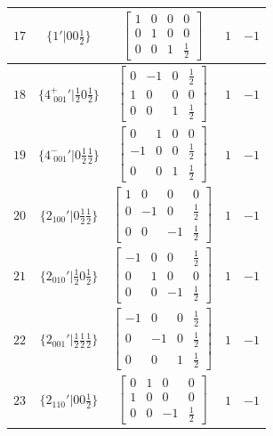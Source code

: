 \documentclass[fleqn,8pt]{jsarticle}
\begin{document}
\begin{longtable}{ccccc}
$ 17 $ & $ \{1{}'|0 0 \frac{1}{2}\} $ & $ \begin{bmatrix} 1 & 0 & 0 & 0 \\ 0 & 1 & 0 & 0 \\ 0 & 0 & 1 & \frac{1}{2} \end{bmatrix} $ & $ 1 $ & $ -1 $ \\ \hline
$ 18 $ & $ \{4^{+}_{\,\,001}{}'|\frac{1}{2} 0 \frac{1}{2}\} $ & $ \begin{bmatrix} 0 & -1 & 0 & \frac{1}{2} \\ 1 & 0 & 0 & 0 \\ 0 & 0 & 1 & \frac{1}{2} \end{bmatrix} $ & $ 1 $ & $ -1 $ \\ \hline
$ 19 $ & $ \{4^{-}_{\,\,001}{}'|0 \frac{1}{2} \frac{1}{2}\} $ & $ \begin{bmatrix} 0 & 1 & 0 & 0 \\ -1 & 0 & 0 & \frac{1}{2} \\ 0 & 0 & 1 & \frac{1}{2} \end{bmatrix} $ & $ 1 $ & $ -1 $ \\ \hline
$ 20 $ & $ \{2{}_{100}{}'|0 \frac{1}{2} \frac{1}{2}\} $ & $ \begin{bmatrix} 1 & 0 & 0 & 0 \\ 0 & -1 & 0 & \frac{1}{2} \\ 0 & 0 & -1 & \frac{1}{2} \end{bmatrix} $ & $ 1 $ & $ -1 $ \\ \hline
$ 21 $ & $ \{2{}_{010}{}'|\frac{1}{2} 0 \frac{1}{2}\} $ & $ \begin{bmatrix} -1 & 0 & 0 & \frac{1}{2} \\ 0 & 1 & 0 & 0 \\ 0 & 0 & -1 & \frac{1}{2} \end{bmatrix} $ & $ 1 $ & $ -1 $ \\ \hline
$ 22 $ & $ \{2{}_{001}{}'|\frac{1}{2} \frac{1}{2} \frac{1}{2}\} $ & $ \begin{bmatrix} -1 & 0 & 0 & \frac{1}{2} \\ 0 & -1 & 0 & \frac{1}{2} \\ 0 & 0 & 1 & \frac{1}{2} \end{bmatrix} $ & $ 1 $ & $ -1 $ \\ \hline
$ 23 $ & $ \{2{}_{110}{}'|0 0 \frac{1}{2}\} $ & $ \begin{bmatrix} 0 & 1 & 0 & 0 \\ 1 & 0 & 0 & 0 \\ 0 & 0 & -1 & \frac{1}{2} \end{bmatrix} $ & $ 1 $ & $ -1 $ \\ \hline

\end{longtable}
\end{document}
